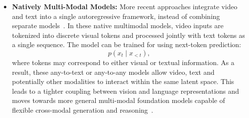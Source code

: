 \begin{itemize}
    \item \textbf{Natively Multi-Modal Models:}
    More recent approaches integrate video and text into a single autoregressive framework, instead of combining separate models~\cite{team2023gemini, Liu2024WorldMO, Jin2023UnifiedLP}. In these native multimodal models, video inputs are tokenized into discrete visual tokens and processed jointly with text tokens as a single sequence.
    The model can be trained for using next-token prediction:
    \begin{equation}
        p(x_t \mid x_{<t}),
    \end{equation}
    where tokens may correspond to either visual or textual information. As a result, these any-to-text or any-to-any models allow video, text and potentially other modalities to interact within the same latent space. This leads to a tighter coupling between vision and language representations and moves towards more general multi-modal foundation models capable of flexible cross-modal generation and reasoning~\cite{McCarthy_2025}.
  
\end{itemize}










